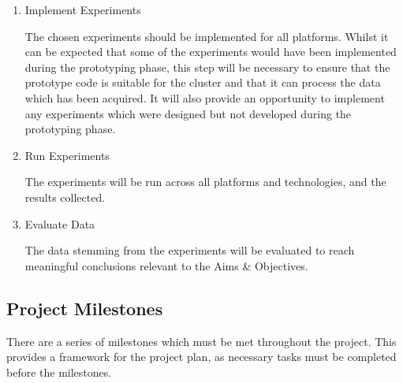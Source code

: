 \begin{enumerate}
	\item Implement Experiments

	The chosen experiments should be implemented for all platforms. Whilst it can be expected that some of the experiments would have been implemented during the prototyping phase, this step will be necessary to ensure that the prototype code is suitable for the cluster and that it can process the data which has been acquired. It will also provide an opportunity to implement any experiments which were designed but not developed during the prototyping phase.

	\item Run Experiments

	The experiments will be run across all platforms and technologies, and the results collected.

	\item Evaluate Data

	The data stemming from the experiments will be evaluated to reach meaningful conclusions relevant to the Aims \& Objectives.

\end{enumerate}

\subsection{Project Milestones}
There are a series of milestones which must be met throughout the project. This provides a framework for the project plan, as necessary tasks must be completed before the milestones.


